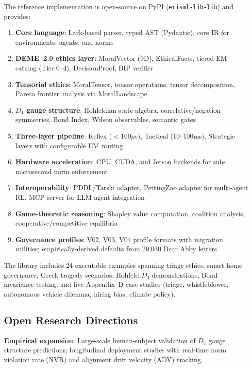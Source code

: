 \documentclass[conference]{IEEEtran}
\begin{document}
The reference implementation is open-source on PyPI (\texttt{erisml-lib-lib}) and provides:

\begin{enumerate}
\item \textbf{Core language}: Lark-based parser, typed AST (Pydantic), core IR for environments, agents, and norms
\item \textbf{DEME~2.0 ethics layer}: MoralVector (9D), EthicalFacts, tiered EM catalog (Tier 0--4), DecisionProof, BIP verifier
\item \textbf{Tensorial ethics}: MoralTensor, tensor operations, tensor decomposition, Pareto frontier analysis via MoralLandscape
\item \textbf{$D_4$ gauge structure}: Hohfeldian state algebra, correlative/negation symmetries, Bond Index, Wilson observables, semantic gates
\item \textbf{Three-layer pipeline}: Reflex ($<100\mu$s), Tactical (10--100ms), Strategic layers with configurable EM routing
\item \textbf{Hardware acceleration}: CPU, CUDA, and Jetson backends for sub-microsecond norm enforcement
\item \textbf{Interoperability}: PDDL/Tarski adapter, PettingZoo adapter for multi-agent RL, MCP server for LLM agent integration
\item \textbf{Game-theoretic reasoning}: Shapley value computation, coalition analysis, cooperative/competitive equilibria
\item \textbf{Governance profiles}: V02, V03, V04 profile formats with migration utilities; empirically-derived defaults from 20,030 Dear Abby letters
\end{enumerate}

The library includes 24 executable examples spanning triage ethics, smart home governance, Greek tragedy scenarios, Hohfeld $D_4$ demonstrations, Bond invariance testing, and five Appendix~D case studies (triage, whistleblower, autonomous vehicle dilemma, hiring bias, climate policy).

\subsection{Open Research Directions}

\textbf{Empirical expansion}: Large-scale human-subject validation of $D_4$ gauge structure predictions; longitudinal deployment studies with real-time norm violation rate (NVR) and alignment drift velocity (ADV) tracking.
\end{document}
